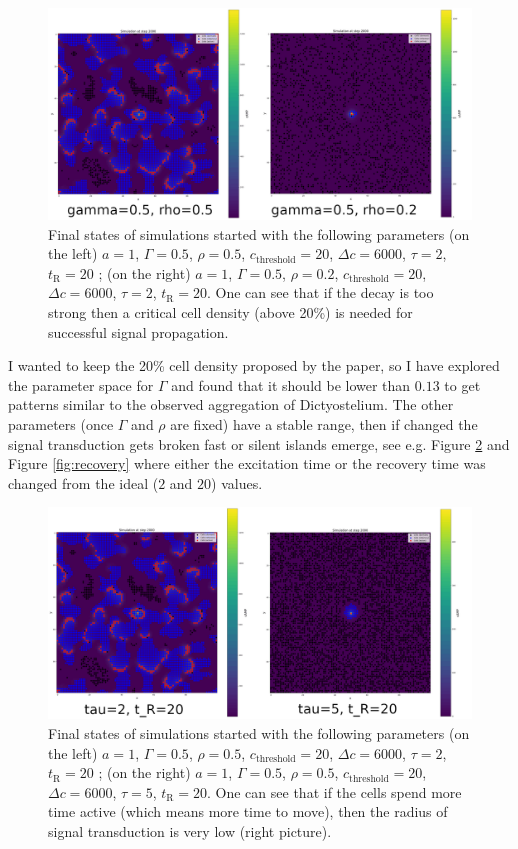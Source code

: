 \documentclass[a4paper,12pt]{article}
\begin{document}
\begin{figure}
\centering
 \includegraphics[width=\textwidth]{gammahalf.png}
 \caption{Final states of simulations started with the following parameters (on the left) $a=1$, $\Gamma=0.5$, $\rho=0.5$, $c_\text{threshold}=20$, $\Delta c=6000$, $\tau=2$, $t_\text{R}=20$ ; (on the right) $a=1$, $\Gamma=0.5$, $\rho=0.2$, $c_\text{threshold}=20$, $\Delta c=6000$, $\tau=2$, $t_\text{R}=20$. One can see that if the decay is too strong then a critical cell density (above 20\%) is needed for successful signal propagation. }
 \label{fig:gammahalf}
\end{figure}

I wanted to keep the 20\% cell density proposed by the paper, so I have explored the parameter space for $\Gamma$ and found that it should be lower than $0.13$ to get patterns similar to the observed aggregation of Dictyostelium. The other parameters (once $\Gamma$ and $\rho$ are fixed) have a stable range, then if changed the signal transduction gets broken fast or silent islands emerge, see e.g. Figure \ref{fig:tau} and Figure \ref{fig:recovery} where either the excitation time or the recovery time was changed from the ideal ($2$ and $20$) values.

\begin{figure}
\centering
 \includegraphics[width=\textwidth]{tau.png}
 \caption{Final states of simulations started with the following parameters (on the left) $a=1$, $\Gamma=0.5$, $\rho=0.5$, $c_\text{threshold}=20$, $\Delta c=6000$, $\tau=2$, $t_\text{R}=20$ ; (on the right) $a=1$, $\Gamma=0.5$, $\rho=0.5$, $c_\text{threshold}=20$, $\Delta c=6000$, $\tau=5$, $t_\text{R}=20$. One can see that if the cells spend more time active (which means more time to move), then the radius of signal transduction is very low (right picture).}
 \label{fig:tau}
\end{figure}
\end{document}
